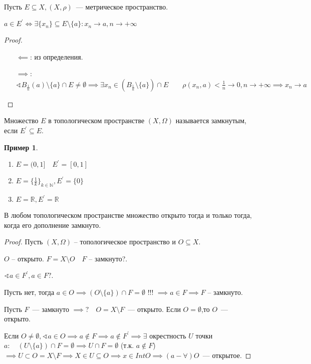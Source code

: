 \documentclass{book}
\newcommand\N{\ensuremath{\mathbb{N}}}
\newcommand\R{\ensuremath{\mathbb{R}}}
\renewcommand\O{\ensuremath{\emptyset}}
\newcommand{\p}[1]{#1^{\prime}}
\theoremstyle{definition}
\newtheorem*{example}{Пример}
\begin{document}
    \begin{statement}
        Пусть $E\subseteq X, (X, \rho)$~--- метрическое пространство.

        $a\in \p E \iff  \exists \{x_{n} \} \subseteq E\setminus \{a\}: x_{n} \to a, n\to +\infty $
    \end{statement}
    \begin{proof}
        \begin{itemize}
            \item [$\impliedby$:] из определения.
            \item [$\implies $:] $\sphericalangle B_{\frac{1}{n}}(a)\setminus \{a\} \cap E\neq \O  \implies  \exists x_n\in (B_{\frac{1}{n}}\setminus \{a\})\cap E\qquad \rho(x_{n} , a) <\frac{1}{n} \to 0, n\to +\infty  \implies  x_{n} \to a$
        \end{itemize}
    \end{proof}

    \begin{definition}
        Множество $E$  в топологическом пространстве  $(X, \Omega)$ называется замкнутым, если $\p E \subseteq E$.
    \end{definition}
    \begin{example}
        \begin{enumerate}
            \item $E = (0,1]\quad \p E = [0,1]$
            \item  $E = \{\frac{1}{k}\}_{k\in \N }, \p E = \{0\}$ 
            \item $E = \R, \p E = \R$
        \end{enumerate}
    \end{example}
    \begin{theorem}
        В любом топологическом пространстве множество открыто тогда и только тогда, когда его дополнение замкнуто.
    \end{theorem}
    \begin{proof}
        Пусть $(X, \Omega)$ -- топологическое пространство и $O\subseteq X$.
    
        $O$ -- открыто. 
        $F = X\setminus O\quad F$ -- замкнуто?.
    
        $\sphericalangle a\in \p F, a\in F?$.
    
        Пусть нет, тогда $a\in O \implies (O\setminus \{a\})\cap F = \O $ !!! $\implies  a\in F \implies F$ -- замкнуто. 
    
        Пусть $F$~--- замкнуто $\implies ?\quad O = X\setminus F$~--- открыто. 
        Если $O = \O$,то $O$~--- открыто.
    
        Если $O\neq \O , \sphericalangle a\in O \implies a \not\in F \implies a\not\in \p F \implies \exists $ окрестность $U$ точки $a:\quad \left( U\setminus \{a\} \right) \cap F = \O \implies  U\cap F = \O $ (т.к. $a\not\in F$) $\implies  U\subset O = X\setminus F \implies  X\in U\subseteq O \implies x\in Int O \implies (a-\forall )O $~--- открытое.
    \end{proof}
    
\end{document}
